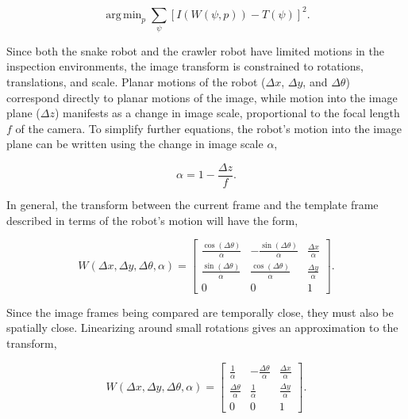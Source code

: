 \documentclass[letterpaper, 10 pt, conference]{ieeeconf}
\DeclareMathOperator*{\argmin}{arg\,min}
\newcommand{\comment}[1]{{\color{red}[#1]}}
\begin{document}
\begin{equation} \label{eq:lkt_min}
    \argmin_p \sum_{\psi} [I(W(\psi, p)) - T(\psi)]^2.
\end{equation}

Since both the snake robot and the crawler robot have limited motions in the inspection environments, the image transform is constrained to rotations, translations, and scale. Planar motions of the robot ($\Delta x$, $\Delta y$, and $\Delta \theta$) correspond directly to planar motions of the image, while motion into the image plane ($\Delta z$) manifests as a change in image scale, proportional to the focal length $f$ of the camera. To simplify further equations, the robot's motion into the image plane can be written using the change in image scale $\alpha$,

\begin{equation} \label{eq:z_motion_conversion}
	\alpha = 1 - \frac{\Delta z}{f}.
\end{equation}

In general, the transform between the current frame and the template frame described in terms of the robot's motion will have the form,


\begin{equation*}
W(\Delta x, \Delta y, \Delta \theta, \alpha) = \begin{bmatrix} \frac{\cos(\Delta \theta)}{\alpha} & -\frac{\sin(\Delta \theta)}{\alpha} & \frac{\Delta x}{\alpha} \\ \frac{\sin(\Delta \theta)}{\alpha} & \frac{\cos(\Delta \theta)}{\alpha} & \frac{\Delta y}{\alpha} \\ 0 & 0 & 1 \end{bmatrix}.
\end{equation*}

Since the image frames being compared are temporally close, they must also be spatially close. Linearizing around small rotations gives an approximation to the transform,

\begin{equation*}
W(\Delta x, \Delta y, \Delta \theta, \alpha) = \begin{bmatrix} \frac{1}{\alpha} & -\frac{\Delta \theta}{\alpha} & \frac{\Delta x}{\alpha} \\ \frac{\Delta \theta}{\alpha} & \frac{1}{\alpha} & \frac{\Delta y}{\alpha} \\ 0 & 0 & 1 \end{bmatrix}.
\end{equation*}
\end{document}
